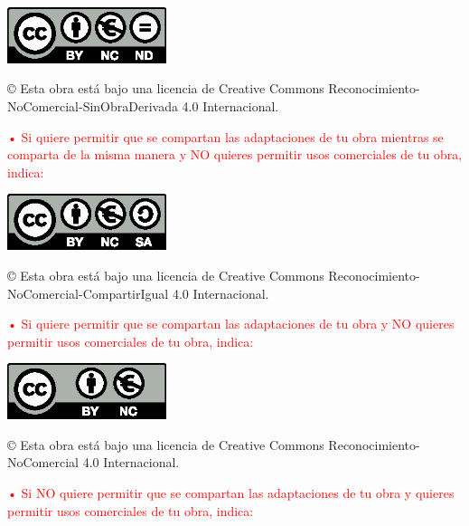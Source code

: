 \documentclass[a4paper,12pt,oneside]{scrbook}
\begin{document}
\begin{center}
\includegraphics[width=4.66cm]{images/licenses/by-nc-nd.eu}
\end{center}

\begin{large}
© Esta obra está bajo una licencia de Creative Commons Reconocimiento-NoComercial-SinObraDerivada 4.0 Internacional.
\end{large}

\bigskip
\bigskip
\bigskip
\textcolor{red}{• Si quiere permitir que se compartan las adaptaciones de tu obra mientras se comparta de la misma manera y NO quieres permitir usos comerciales de tu obra, indica:}

\begin{center}
\includegraphics[width=4.66cm]{images/licenses/by-nc-sa.eu}
\end{center}

\begin{large}
© Esta obra está bajo una licencia de Creative Commons Reconocimiento-NoComercial-CompartirIgual 4.0 Internacional.
\end{large}

\bigskip
\bigskip
\bigskip
\textcolor{red}{• Si quiere permitir que se compartan las adaptaciones de tu obra y NO quieres permitir usos comerciales de tu obra, indica:}

\begin{center}
\includegraphics[width=4.66cm]{images/licenses/by-nc.eu}
\end{center}

\begin{large}
© Esta obra está bajo una licencia de Creative Commons Reconocimiento-NoComercial 4.0 Internacional.
\end{large}

\bigskip
\bigskip
\bigskip
\textcolor{red}{• Si NO quiere permitir que se compartan las adaptaciones de tu obra y quieres permitir usos comerciales de tu obra, indica:}
\end{document}
